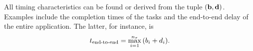 All timing characteristics can be found or derived from the tuple $(\mathbf{b}, \mathbf{d})$.
Examples include the completion times of the tasks and the end-to-end delay of
the entire application. The latter, for instance, is
\[
  t_\text{end-to-end} = \max_{i = 1}^{n_\tau} \, (b_i + d_i).
\]
